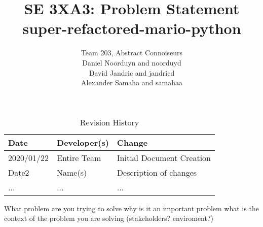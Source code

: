 \documentclass{article}
\title{SE 3XA3: Problem Statement\\super-refactored-mario-python}
\author{Team 203, Abstract Connoiseurs
		\\ Daniel Noorduyn and noorduyd
		\\ David Jandric and jandricd
		\\ Alexander Samaha and samahaa
}
\date{}
\begin{document}
\begin{table}[hp]
\caption{Revision History} \label{TblRevisionHistory}
\begin{tabularx}{\textwidth}{llX}
\toprule
\textbf{Date} & \textbf{Developer(s)} & \textbf{Change}\\
\midrule
2020/01/22 & Entire Team & Initial Document Creation\\
Date2 & Name(s) & Description of changes\\
... & ... & ...\\
\bottomrule
\end{tabularx}
\end{table}

\newpage

\maketitle

What problem are you trying to solve
why is it an important problem
what is the context of the problem you are solving (stakeholders? enviroment?)







\end{document}
